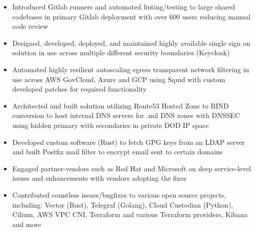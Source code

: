 \documentclass[11pt,letterpaper,sans]{moderncv}        %
\begin{document}
{\begin{itemize}
\item Introduced Gitlab runners and automated linting/testing to large shared codebases in primary Gitlab deployment with over 600 users reducing manual code review
\item Designed, developed, deployed, and maintained highly available single sign on solution in use across multiple different security boundaries (Keycloak)
\item Automated highly resilient autoscaling egress transparent network filtering in use across AWS GovCloud, Azure and GCP using Squid with custom developed patches for required functionality
\item Architected and built solution utilizing Route53 Hosted Zone to BIND conversion to host internal DNS servers for .mil DNS zones with DNSSEC using hidden primary with secondaries in private DOD IP space
\item Developed custom software (Rust) to fetch GPG keys from an LDAP server and built Postfix mail filter to encrypt email sent to certain domains
\item Engaged partner-vendors such as Red Hat and Microsoft on deep service-level issues and enhancements with vendors adopting the fixes
\item Contributed countless issues/bugfixes to various open source projects, including: Vector (Rust), Telegraf (Golang), Cloud Custodian (Python), Cilium, AWS VPC CNI, Terraform and various Terraform providers, Kibana and more 
\end{itemize}
}

\end{document}
